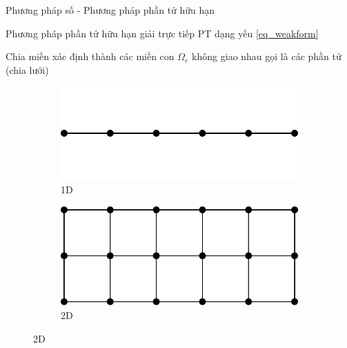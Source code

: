 \documentclass[aspectratio=169, t]{beamer} %
\begin{document}
\begin{frame}{Phương pháp số - Phương pháp phần tử hữu hạn}

\vspace{7mm}

Phương pháp phần tử hữu hạn giải trực tiếp PT dạng yếu \ref{eq_weakform}

Chia miền xác định thành các miền con $\Omega_e$ không giao nhau gọi là các phần tử (chia lưới)
\begin{figure}[htbp]
    \centering
    \begin{subfigure}[b]{0.45\linewidth}
        \centering
        \includegraphics[width=\linewidth]{Slides/Figure/FEM1D.pdf}
        \caption{1D}
    \end{subfigure}\hfill
    \begin{subfigure}[b]{0.45\linewidth}
        \centering
        \includegraphics[width=\linewidth]{Slides/Figure/FEM2D.pdf}
        \caption{2D}
    \end{subfigure}
\end{figure}
\end{frame}
\end{document}
